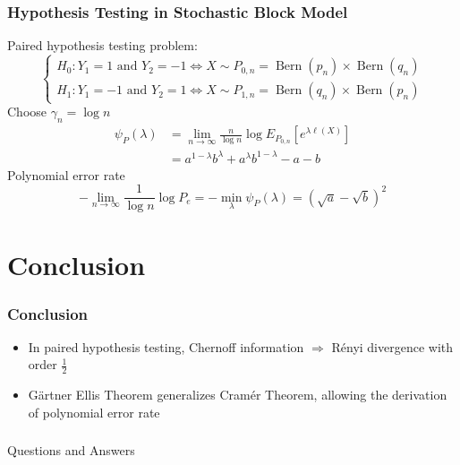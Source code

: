 \documentclass{beamer}
\DeclareMathOperator{\Bern}{Bern}
\begin{document}
\begin{frame}
\frametitle{
Hypothesis Testing in Stochastic Block Model} 
Paired hypothesis testing problem:
\begin{equation*}
\begin{cases}
H_0: Y_1 = 1 \textrm{ and } Y_2 = -1 \iff X \sim P_{0,n} = \Bern(p_n) \times \Bern(q_n)\\
H_1: Y_1 = -1 \textrm{ and } Y_2 = 1 \iff X \sim P_{1,n} = \Bern(q_n) \times \Bern(p_n)
\end{cases}
\end{equation*}
Choose $\gamma_n = \log n$
\begin{align*}
\psi_P(\lambda) &= \lim_{n\to \infty} \frac{n}{\log n} \log E_{P_{0,n}} [e^{\lambda \ell(X)}]\\
&=a^{1-\lambda}b^{\lambda}
+a^{\lambda}b^{1-\lambda} -a-b
\end{align*}
Polynomial error rate
\begin{equation*}
-\lim_{n\to\infty} \frac{1}{\log n}\log P_e = -\min_{\lambda} \psi_P(\lambda) = (\sqrt{a}-\sqrt{b})^2
\end{equation*}
\end{frame}
\section{Conclusion}
\begin{frame}
\frametitle{Conclusion}
\begin{itemize}
\item In paired hypothesis testing, Chernoff information $\Rightarrow$ Rényi divergence with order $\frac{1}{2}$
\item Gärtner Ellis Theorem generalizes Cramér Theorem, allowing the derivation of polynomial error rate
\end{itemize}
\end{frame}

\begin{frame}
\frametitle{}
\begin{block}{}
\centering
{\Huge Questions and Answers}
\end{block}
\end{frame}
\end{document}
